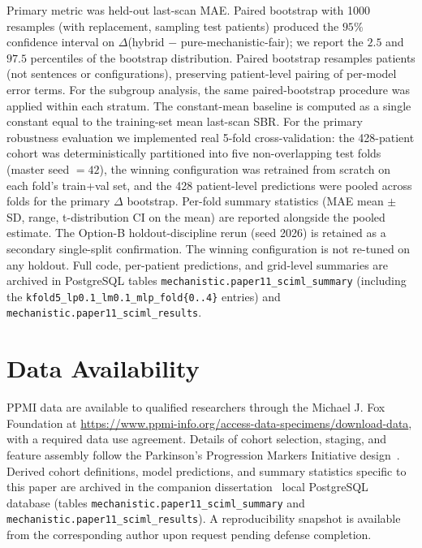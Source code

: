 Primary metric was held-out last-scan MAE. Paired bootstrap with 1000 resamples (with replacement, sampling test patients) produced the $95\%$ confidence interval on $\Delta$(hybrid $-$ pure-mechanistic-fair); we report the $2.5$ and $97.5$ percentiles of the bootstrap distribution. Paired bootstrap resamples patients (not sentences or configurations), preserving patient-level pairing of per-model error terms. For the subgroup analysis, the same paired-bootstrap procedure was applied within each stratum. The constant-mean baseline is computed as a single constant equal to the training-set mean last-scan SBR. For the primary robustness evaluation we implemented real 5-fold cross-validation: the 428-patient cohort was deterministically partitioned into five non-overlapping test folds (master seed $=42$), the winning configuration was retrained from scratch on each fold's train+val set, and the 428 patient-level predictions were pooled across folds for the primary $\Delta$ bootstrap. Per-fold summary statistics (MAE mean $\pm$ SD, range, t-distribution CI on the mean) are reported alongside the pooled estimate. The Option-B holdout-discipline rerun (seed 2026) is retained as a secondary single-split confirmation. The winning configuration is not re-tuned on any holdout. Full code, per-patient predictions, and grid-level summaries are archived in PostgreSQL tables \texttt{mechanistic.paper11\_sciml\_summary} (including the \texttt{kfold5\_lp0.1\_lm0.1\_mlp\_fold\{0..4\}} entries) and \texttt{mechanistic.paper11\_sciml\_results}.

\section*{Data Availability}

PPMI data are available to qualified researchers through the Michael J. Fox Foundation at \url{https://www.ppmi-info.org/access-data-specimens/download-data}, with a required data use agreement. Details of cohort selection, staging, and feature assembly follow the Parkinson's Progression Markers Initiative design~\cite{marek2018ppmi, brumm2023milestone}. Derived cohort definitions, model predictions, and summary statistics specific to this paper are archived in the companion dissertation~\cite{dupre2026dissertation} local PostgreSQL database (tables \texttt{mechanistic.paper11\_sciml\_summary} and \texttt{mechanistic.paper11\_sciml\_results}). A reproducibility snapshot is available from the corresponding author upon request pending defense completion.

